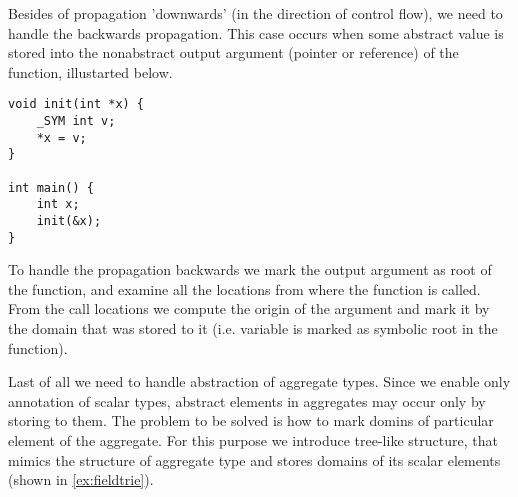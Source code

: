 Besides of propagation 'downwards' (in the direction of control flow), we need
to handle the backwards propagation. This case occurs when some abstract value is
stored into the nonabstract output argument (pointer or reference) of the function,
illustarted below.

\begin{verbatim}
void init(int *x) {
    _SYM int v;
    *x = v;
}

int main() {
    int x;
    init(&x);
}

\end{verbatim}

To handle the propagation backwards we mark the output argument as root of the
function, and examine all the locations from where the function is called. From
the call locations we compute the origin of the argument and mark it by the
domain that was stored to it (i.e. variable  is marked as symbolic root
in the  function).

Last of all we need to handle abstraction of aggregate types. Since we enable
only annotation of scalar types, abstract elements in aggregates may occur
only by storing to them. The problem to be solved is how to mark domins of
particular element of the aggregate. For this purpose we introduce tree-like
structure, that mimics the structure of aggregate type and stores domains of
its scalar elements (shown in \autoref{ex:fieldtrie}).

